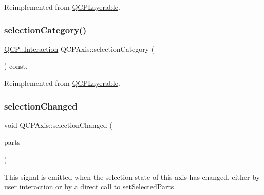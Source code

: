 Reimplemented from \mbox{\hyperlink{class_q_c_p_layerable_a7498c2d0d081cf7cad0fb3bb93aa0e91}{Q\+C\+P\+Layerable}}.

\mbox{\label{class_q_c_p_axis_ab751e3e96495716a2f6742ca7d7b3d49}} 
\subsubsection{\texorpdfstring{selectionCategory()}{selectionCategory()}}
{\footnotesize\ttfamily \mbox{\hyperlink{namespace_q_c_p_a2ad6bb6281c7c2d593d4277b44c2b037}{Q\+C\+P\+::\+Interaction}} Q\+C\+P\+Axis\+::selection\+Category (\begin{DoxyParamCaption}{ }\end{DoxyParamCaption}) const\hspace{0.3cm}{\ttfamily [protected]}, {\ttfamily [virtual]}}



Reimplemented from \mbox{\hyperlink{class_q_c_p_layerable_a908c9edda761886f33893be326dab77d}{Q\+C\+P\+Layerable}}.

\mbox{\label{class_q_c_p_axis_a62b598abeee7174a05f9d542cc85b1f5}} 
\subsubsection{\texorpdfstring{selectionChanged}{selectionChanged}}
{\footnotesize\ttfamily void Q\+C\+P\+Axis\+::selection\+Changed (\begin{DoxyParamCaption}\item[{const Q\+C\+P\+Axis\+::\+Selectable\+Parts \&}]{parts }\end{DoxyParamCaption})\hspace{0.3cm}{\ttfamily [signal]}}

This signal is emitted when the selection state of this axis has changed, either by user interaction or by a direct call to \mbox{\hyperlink{class_q_c_p_axis_ab9d7a69277dcbed9119b3c1f25ca19c3}{set\+Selected\+Parts}}. \mbox{\label{class_q_c_p_axis_a63b7103c57fe9acfbce164334ea837f8}} 
